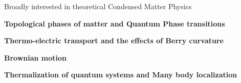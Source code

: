 

\begin{cventries}

  \cventry
    {} %
    {Broadly interested in theoretical Condensed Matter Physics} %
    {} %
    {} %
    {
      \begin{cvitems} %
        \item {\textbf{Topological phases of matter and Quantum Phase transitions}}
        \item {\textbf{Thermo-electric transport and the effects of Berry curvature}}
        \item {\textbf{Brownian motion}}
        \item {\textbf{Thermalization of quantum systems and Many body localization}}
      \end{cvitems}
    }

\end{cventries}
